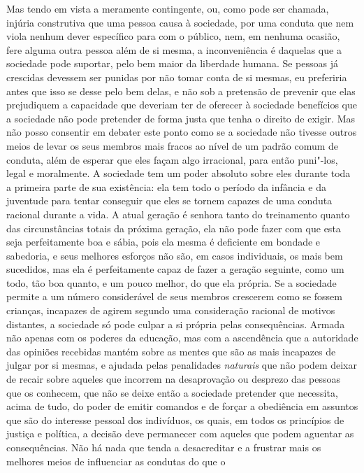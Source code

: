 Mas tendo em vista a meramente contingente, ou, como pode ser chamada,
injúria construtiva que uma pessoa causa à sociedade, por uma conduta
que nem viola nenhum dever específico para com o público, nem, em
nenhuma ocasião, fere alguma outra pessoa além de si mesma, a
inconveniência é daquelas que a sociedade pode suportar, pelo bem maior
da liberdade humana. Se pessoas já crescidas devessem ser punidas por
não tomar conta de si mesmas, eu preferiria antes que isso se desse
pelo bem delas, e não sob a pretensão de prevenir que elas prejudiquem
a capacidade que deveriam ter de oferecer à sociedade benefícios que a
sociedade não pode pretender de forma justa que tenha o direito de exigir.
Mas não posso consentir em debater este ponto como se a sociedade não
tivesse outros meios de levar os seus membros mais fracos ao nível de
um padrão comum de conduta, além de esperar que eles façam algo
irracional, para então puni"-los, legal e moralmente. A sociedade tem
um poder absoluto sobre eles durante toda a primeira parte de sua
existência: ela tem todo o período da infância e da juventude para
tentar conseguir que eles se tornem capazes de uma conduta racional
durante a vida. A atual geração é senhora tanto do treinamento quanto
das circunstâncias totais da próxima geração, ela não pode fazer com
que esta seja perfeitamente boa e sábia, pois ela mesma é deficiente
em bondade e sabedoria, e seus melhores esforços não são, em casos
individuais, os mais bem sucedidos, mas ela é perfeitamente capaz de
fazer a geração seguinte, como um todo, tão boa quanto, e um pouco
melhor, do que ela própria. Se a sociedade permite a um número
considerável de seus membros crescerem como se fossem crianças,
incapazes de agirem segundo uma consideração racional de motivos
distantes, a sociedade só pode culpar a si própria pelas consequências.
Armada não apenas com os poderes da educação, mas com a ascendência que
a autoridade das opiniões recebidas mantém sobre as mentes que são as
mais incapazes de julgar por si mesmas, e ajudada pelas penalidades
\textit{naturais} que não podem deixar de recair sobre aqueles que
incorrem na desaprovação ou desprezo das pessoas que os conhecem, que
não se deixe então a sociedade pretender que necessita, acima de tudo,
do poder de emitir comandos e de forçar a obediência em assuntos que são
do interesse pessoal dos indivíduos, os quais, em todos os princípios
de justiça e política, a decisão deve permanecer com aqueles que
podem aguentar as consequências. Não há nada que tenda a desacreditar e
a frustrar mais os melhores meios de influenciar as condutas do que o

